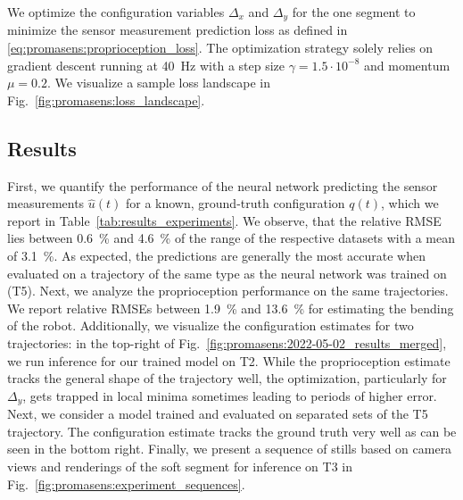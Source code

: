 We optimize the configuration variables $\Delta_x$ and $\Delta_y$ for the one segment to minimize the sensor measurement prediction loss as defined in \eqref{eq:promasens:proprioception_loss}.
The optimization strategy solely relies on gradient descent running at \SI{40}{Hz} %
with a step size $\gamma = 1.5 \cdot 10^{-8}$ and momentum $\mu = 0.2$. %
We visualize a sample loss landscape in Fig.~\ref{fig:promasens:loss_landscape}.

\subsection{Results}\label{sub:promasens:experimental_results}
First, we quantify the performance of the neural network predicting the sensor measurements $\hat{u}(t)$ for a known, ground-truth configuration $q(t)$, which we report in Table~\ref{tab:results_experiments}.
We observe, that the relative RMSE lies between \SI{0.6}{\percent} and \SI{4.6}{\percent} of the range of the respective datasets with a mean of \SI{3.1}{\percent}.
As expected, the predictions are generally the most accurate when evaluated on a trajectory of the same type as the neural network was trained on (T5).
% 
Next, we analyze the proprioception performance on the same trajectories.
We report relative RMSEs between \SI{1.9}{\percent} and \SI{13.6}{\percent} for estimating the bending of the robot.
Additionally, we visualize the configuration estimates for two trajectories: in the top-right of Fig.~\ref{fig:promasens:2022-05-02_results_merged}, we run inference for our trained model on T2. While the proprioception estimate tracks the general shape of the trajectory well, the optimization, particularly for $\Delta_y$, gets trapped in local minima sometimes leading to periods of higher error.
Next, we consider a model trained and evaluated on separated sets of the T5 trajectory. The configuration estimate tracks the ground truth very well as can be seen in the bottom right.
Finally, we present a sequence of stills based on camera views and renderings of the soft segment for inference on T3 in Fig.~\ref{fig:promasens:experiment_sequences}.

